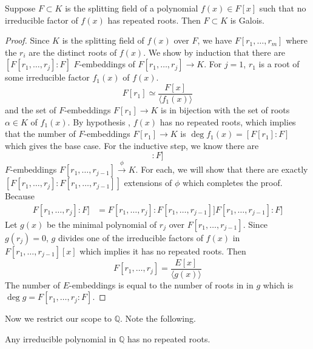   \begin{theorem}
    Suppose $F \subset K$ is the splitting field of a polynomial $f(x) \in F[x]$ such that no irreducible factor of $f(x)$ has repeated roots. Then $F \subset K$ is Galois. 
  \end{theorem}
  \begin{proof}
    Since $K$ is the splitting field of $f(x)$ over $F$, we have $F[r_1, \ldots, r_m]$ where the $r_i$ are the distinct roots of $f(x)$. We show by induction that there are $[F[r_1, \ldots, r_j]:F]$ $F$-embeddings of $F[r_1, \ldots, r_j] \to K$. For $j = 1$, $r_1$ is a root of some irreducible factor $f_1 (x)$ of $f(x)$. 
    \begin{equation}
      F[r_1] \simeq \frac{F[x]}{\langle f_1 (x) \rangle}
    \end{equation} 
    and the set of $F$-embeddings $F[r_1] \to K$ is in bijection with the set of roots $\alpha \in K$ of $f_1 (x)$. By hypothesis , $f(x)$ has no repeated roots, which implies that the number of $F$-embeddings $F[r_1] \to K$ is $\deg{f_1 (x)} = [F[r_1]: F]$ which gives the base case. For the inductive step, we know there are 
    \begin{equation}
      [F[r_1, \ldots, r_{j-1}]: F] 
    \end{equation}
    $F$-embeddings $F[r_1, \ldots, r_{j-1}] \xrightarrow{\phi} K$. For each, we will show that there are exactly $[F[r_1, \ldots, r_j]: F[r_1, \ldots, r_{j-1}]]$ extensions of $\phi$ which completes the proof. Because 
    \begin{align}
      F[r_1, \ldots, r_j]: F] & = F[r_1, \ldots, r_j]: F[r_1, \ldots, r_{j-1}]] F[r_1, \ldots, r_{j-1}]: F]
    \end{align} 
    Let $g(x)$ be the minimal polynomial of $r_j$ over $F[r_1, \ldots, r_{j-1}]$. Since $g(r_j) = 0$, $g$ divides one of the irreducible factors of $f(x)$ in $F[r_1, \ldots, r_{j-1}] [x]$ which implies it has no repeated roots. Then 
    \begin{equation}
      F[r_1, \ldots, r_j] = \frac{E[x]}{\langle g(x)\rangle} 
    \end{equation}
    The number of $E$-embeddings is equal to the number of roots in in $g$ which is $\deg{g} = F[r_1, \ldots, r_j: F]$.
  \end{proof} 

  Now we restrict our scope to $\mathbb{Q}$. Note the following. 

  \begin{lemma}
    Any irreducible polynomial in $\mathbb{Q}$ has no repeated roots. 
  \end{lemma}

